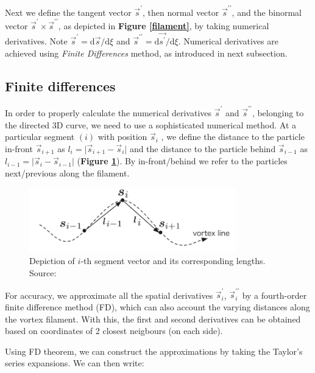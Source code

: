 Next we define the tangent vector $\vec{s}^{\prime}$, then normal vector $\vec{s}^{\prime\prime}$, and the binormal vector $\vec{s}^{\prime} \times \vec{s}^{\prime\prime}$, as depicted in \textbf{Figure \ref{filament}}, by taking numerical derivatives.
Note $\vec{s}^{\prime} = \text{d}\vec{s} / \text{d}\xi$ and $\vec{s}^{\prime\prime} = \text{d}\vec{s^{\prime}} / \text{d}\xi$.
Numerical derivatives are achieved using \textit{Finite Differences} method, as introduced in next subsection.


\subsection*{Finite differences}

In order to properly calculate the numerical derivatives $\vec{s}^{\prime}$ and $\vec{s}^{\prime\prime}$, belonging to the directed 3D curve, we need to use a sophisticated numerical method. At a particular segment $(i)$ with position $\vec{s}_i$ , we define the distance to the particle in-front $\vec{s}_{i+1}$ as $l_{i} = \vert \vec{s}_{i+1} - \vec{s}_i \vert$ and the distance to the particle behind
$\vec{s}_{i-1}$ as $l_{i-1} = \vert \vec{s}_i - \vec{s}_{i-1} \vert$ (\textbf{Figure \ref{FD}}).
By in-front/behind we refer to the particles next/previous along the filament.

\begin{figure}[h]
	\centering
	\includegraphics[width=0.8\textwidth]{graphics/simul/finite-diff}
	\caption{Depiction of $i$-th segment vector and its corresponding lengths. Source: \cite{tsubota}}
	\label{FD}
\end{figure}

For accuracy, we approximate all the spatial derivatives $\vec{s}_i^{\prime}$, $\vec{s}_i^{\prime\prime}$ by a
fourth-order finite difference method (FD), which can also account the
varying distances along the vortex filament. With this, the first and second derivatives can be obtained based on coordinates of 2 closest neigbours (on each side).

Using FD theorem, we can construct the approximations by taking the Taylor's series expansions. We can then write:

